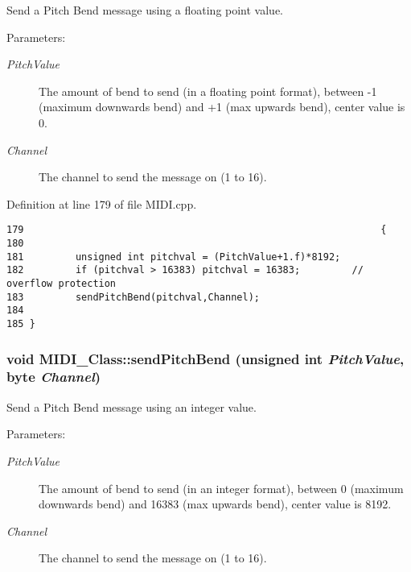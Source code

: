 Send a Pitch Bend message using a floating point value. \begin{Desc}
\item[Parameters:]
\begin{description}
\item[{\em PitchValue}]The amount of bend to send (in a floating point format), between -1 (maximum downwards bend) and +1 (max upwards bend), center value is 0. \item[{\em Channel}]The channel to send the message on (1 to 16). \end{description}
\end{Desc}


Definition at line 179 of file MIDI.cpp.

\begin{Code}\begin{verbatim}179                                                              {
180 
181         unsigned int pitchval = (PitchValue+1.f)*8192;
182         if (pitchval > 16383) pitchval = 16383;         // overflow protection
183         sendPitchBend(pitchval,Channel);
184         
185 }
\end{verbatim}
\end{Code}


\hypertarget{class_m_i_d_i___class_45dcd73e3b8a107334e687750514f8b5}{
\subsubsection[{sendPitchBend}]{\setlength{\rightskip}{0pt plus 5cm}void MIDI\_\-Class::sendPitchBend (unsigned int {\em PitchValue}, \/  {\bf byte} {\em Channel})}}
\label{class_m_i_d_i___class_45dcd73e3b8a107334e687750514f8b5}


Send a Pitch Bend message using an integer value. \begin{Desc}
\item[Parameters:]
\begin{description}
\item[{\em PitchValue}]The amount of bend to send (in an integer format), between 0 (maximum downwards bend) and 16383 (max upwards bend), center value is 8192. \item[{\em Channel}]The channel to send the message on (1 to 16). \end{description}
\end{Desc}


